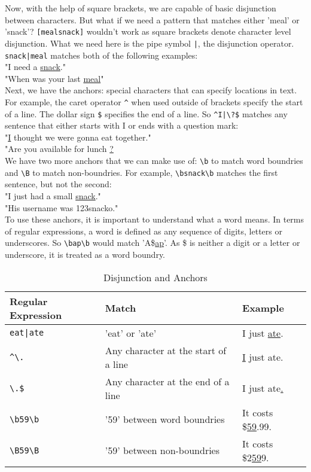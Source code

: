 Now, with the help of square brackets, we are capable of basic disjunction between characters. 
But what if we need a pattern that matches either 'meal' or 'snack'?
\texttt{[mealsnack]} wouldn't work as square brackets denote character level disjunction. 
What we need here is the pipe symbol \texttt{|}, the disjunction operator.
\texttt{snack|meal} matches both of the following examples:\\
"I need a \underline{snack}."\\
"When was your last \underline{meal}"\\
Next, we have the anchors: special characters that can specify locations in text.
For example, the caret operator \texttt{\^{}} when used outside of brackets specify the start of a line.
The dollar sign \texttt{\$} specifies the end of a line.
So \texttt{\^{}I|\textbackslash?\$} matches any sentence that either starts with I or ends with a question mark:\\
"\underline{I} thought we were gonna eat together."\\
"Are you available for lunch \underline{?}\\
We have two more anchors that we can make use of:
\texttt{\textbackslash b} to match word boundries and \texttt{\textbackslash B} to match non-boundries.
For example, \texttt{\textbackslash bsnack\textbackslash b} matches the first sentence, but not the second:\\
"I just had a small \underline{snack}."\\
"His username was 123snacko."\\
To use these anchors, it is important to understand what a word means.
In terms of regular expressions, a word is defined as any sequence of digits, letters or underscores.
So \texttt{\textbackslash bap\textbackslash b} would match 'A\$\underline{ap}'.
As \$ is neither a digit or a letter or underscore, it is treated as a word boundry.

\begin{table}[htbp]
  \caption[Regular Expression Disjunction and Anchors]{Disjunction and Anchors}\label{tab:re_da}		
  \centering
  \begin{tabular}{l l l}
    Regular Expression&Match&Example\\ \toprule
    \texttt{eat|ate}&'eat' or 'ate'&I just \underline{ate}.\\ \hline
    \texttt{\^{}\textbackslash .}&Any character at the start of a line&\underline{I} just ate.\\ \hline
    \texttt{\textbackslash .\$}&Any character at the end of a line&I just ate\underline{.}\\ \hline
    \texttt{\textbackslash b59\textbackslash b}&'59' between word boundries&It costs \$\underline{59}.99.\\ \hline
    \texttt{\textbackslash B59\textbackslash B}&'59' between non-boundries&It costs \$2\underline{59}9.\\ \hline
  \end{tabular}
\end{table}

